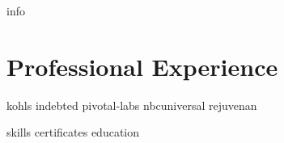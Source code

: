 \documentclass[letterpaper,11pt]{article}
\begin{document}
{info}
\section{Professional Experience}
  {kohls}
  {indebted}
  {pivotal-labs}
  {nbcuniversal}
  {rejuvenan}

{skills}
{certificates}
{education}
\end{document}
